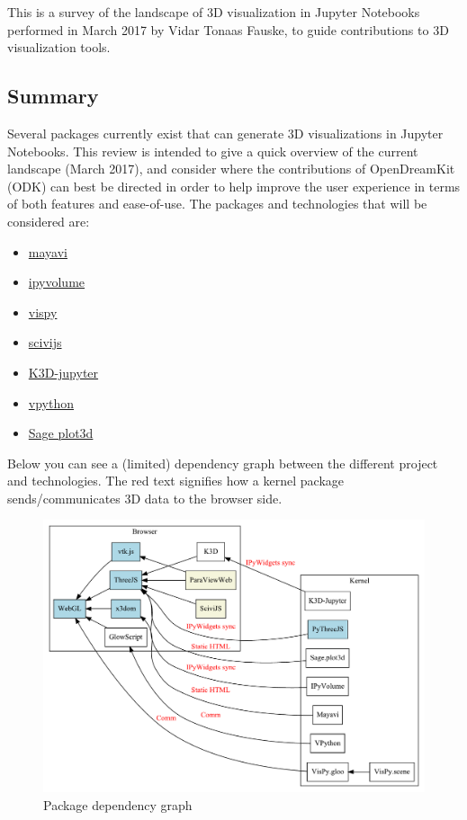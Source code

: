 This is a survey of the landscape of 3D visualization in Jupyter Notebooks
performed in March 2017 by Vidar Tonaas Fauske,
to guide \ODK contributions to 3D visualization tools.

\subsection{Summary}

Several packages currently exist that can generate 3D visualizations in
Jupyter Notebooks. This review is intended to give a quick overview of
the current landscape (March 2017), and consider where the contributions
of OpenDreamKit (ODK) can best be directed in order to help improve the
user experience in terms of both features and ease-of-use. The packages
and technologies that will be considered are:

\begin{itemize}
\tightlist
\item
  \href{http://docs.enthought.com/mayavi/mayavi/tips.html\#using-mayavi-in-jupyter-notebooks}{mayavi}
\item
  \href{https://github.com/maartenbreddels/ipyvolume}{ipyvolume}
\item
  \href{http://vispy.org}{vispy}
\item
  \href{https://www.logilab.org/blogentry/8541176}{scivijs}
\item
  \href{https://github.com/K3D-tools/K3D-jupyter}{K3D-jupyter}
\item
  \href{http://vpython.org}{vpython}
\item
  \href{http://nbviewer.jupyter.org/github/sagemanifolds/SageManifolds/blob/master/Worksheets/v1.0/SM_sphere_S2.ipynb}{Sage
  plot3d}
\end{itemize}

Below you can see a (limited) dependency graph between the different
project and technologies. The red text signifies how a kernel package
sends/communicates 3D data to the browser side.

\begin{figure}[h]
\label{fig:pdep}
\centering
\includegraphics[width=0.6\paperwidth]{existing_tools/dependencies.pdf}
\caption{Package dependency graph}
\end{figure}

